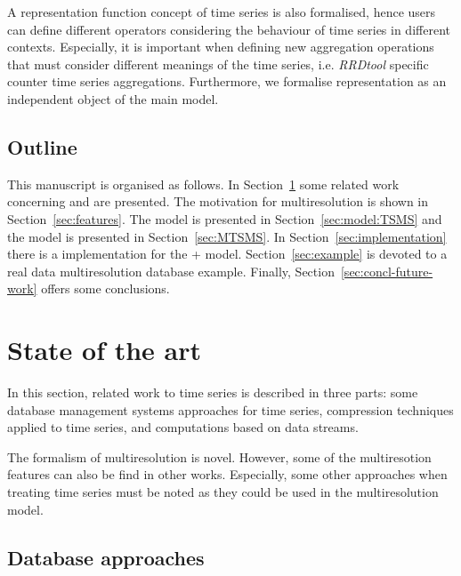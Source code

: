 A representation function concept of time series is also formalised, hence
users can define different operators considering the behaviour of time
series in different contexts. Especially, it is important when defining
new aggregation operations that must consider different meanings of
the time series, i.e. \emph{RRDtool} specific counter time series
aggregations. Furthermore, we formalise representation as an
independent object of the main model.




\subsection{Outline}

This manuscript is organised as follows.  In
Section~\ref{sec:related-work} some related work concerning
 and  are presented.  The motivation for
multiresolution is shown in Section~\ref{sec:features}.  The
 model is presented in Section~\ref{sec:model:TSMS} and the
 model is presented in Section~\ref{sec:MTSMS}.  In
Section~\ref{sec:implementation} there is a implementation
for the + model.  Section~\ref{sec:example} is
devoted to a real data multiresolution database example.  Finally,
Section~\ref{sec:concl-future-work} offers some conclusions.





\section{State of the art}
\label{sec:related-work}

In this section, related work to time series is
described in three parts: some database management systems
approaches for time series, compression techniques applied to time
series, and computations based on data streams.

The formalism of multiresolution is novel. However, some of the
multiresotion features can also be find in other works.  Especially,
some other approaches when treating time series must be noted as they
could be used in the multiresolution model.  

\subsection{Database approaches}

